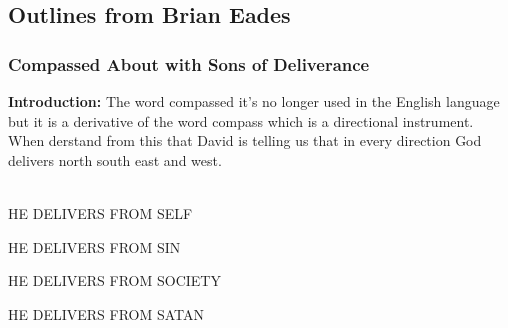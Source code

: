 \subsection{Outlines from Brian Eades}


\subsubsection{Compassed About with Sons of Deliverance}


\noindent  \textbf{Introduction: } The word compassed it's no longer used in the English language but it is a derivative of the word compass which is a directional instrument. When derstand from this that David is telling us that in every direction God delivers north south east and west.\\
\\
\begin{compactenum}[I.]
    \item HE DELIVERS FROM SELF
    \item HE DELIVERS FROM SIN
    \item HE DELIVERS FROM SOCIETY
    \item HE DELIVERS FROM SATAN
\end{compactenum}



